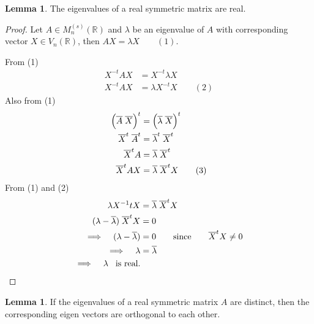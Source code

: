 \documentclass[11pt,a4paper]{article}
\theoremstyle{definition}
\newtheorem{lem}[thm]{Lemma}
\begin{document}
\begin{lem}\label{lem:symmetric-real-eigenvalues}
The eigenvalues of a real symmetric matrix are real.
\end{lem}


\begin{proof}
Let $A\in M_n^{(s)}(\mathbb{R})$ and $\lambda$ be an eigenvalue of $A$ with corresponding vector $X\in V_n(\mathbb{R})$, then $AX=\lambda X\qquad (1)$.

From (1)
\begin{align*}
X^{-t}AX &=X^{-t}\lambda X\\
X^{-t}AX&=\lambda X^{-t}X\qquad (2)
\end{align*}
Also from (1)
\begin{align*}
\Big(\overline{A}\hspace{0.1cm}\overline{X}\Big)^t &=\Big(\overline{\lambda}\hspace{0.1cm}\overline{X}\Big)^t\\
\overline{X}^t\hspace{0.1cm}\overline{A}^t &=\overline{\lambda}^t\hspace{0.1cm}\overline{X}^t\\
\overline{X}^tA &=\overline{\lambda}\hspace{0.1cm}\overline{X}^t\\
\overline{X}^tAX &=\overline{\lambda}\hspace{0.1cm}\overline{X}^tX\qquad (3)
\end{align*}
From (1) and (2)
\begin{align*}
\lambda X^{-1}tX &=\overline{\lambda}\hspace{0.1cm}\overline{X}^tX\\
(\lambda-\overline{\lambda})\hspace{0.1cm}\overline{X}^tX &=0\\
\implies \hspace{0.3cm}(\lambda-\overline{\lambda})&=0\qquad\text{since}\qquad \overline{X}^tX\neq 0\\
\implies \hspace{0.3cm} \lambda &=\overline{\lambda}\\
\implies \hspace{0.3cm}\lambda \hspace{0.3cm}\text{is real}.\\
\end{align*}
\end{proof}


\begin{lem}
If the eigenvalues of a real symmetric matrix $A$ are distinct, then the corresponding eigen vectors are orthogonal to each other.
\end{lem}
\end{document}
